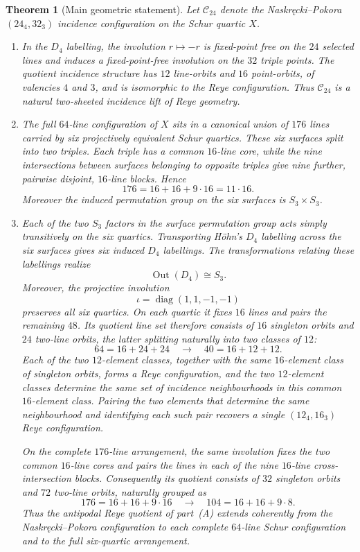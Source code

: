 \documentclass[10pt]{article}
\newtheorem{theorem}{Theorem}
\begin{document}
\begin{theorem}[Main geometric statement]\label{thm:main}
Let $\mathcal C_{24}$ denote the Naskr\k{e}cki--Pokora $(24_4,32_3)$ incidence configuration on the Schur quartic $X$.
\begin{enumerate}
\item[(A)] In the $D_4$ labelling, the involution $r\mapsto-r$ is fixed-point free on the $24$ selected lines and induces a fixed-point-free involution on the $32$ triple points.  The quotient incidence structure has $12$ line-orbits and $16$ point-orbits, of valencies $4$ and $3$, and is isomorphic to the Reye configuration.  Thus $\mathcal C_{24}$ is a natural two-sheeted incidence lift of Reye geometry.
\item[(B)] The full $64$-line configuration of $X$ sits in a canonical union of $176$ lines carried by six projectively equivalent Schur quartics.  These six surfaces split into two triples.  Each triple has a common $16$-line core, while the nine intersections between surfaces belonging to opposite triples give nine further, pairwise disjoint, $16$-line blocks.  Hence
\[
176=16+16+9\cdot16=11\cdot16.
\]
Moreover the induced permutation group on the six surfaces is $S_3\times S_3$.
\item[(C)] Each of the two $S_3$ factors in the surface permutation group
acts simply transitively on the six quartics.  Transporting H\"ohn's
$D_4$ labelling across the six surfaces gives six induced $D_4$ labellings.
The transformations relating these labellings realize
\[
\operatorname{Out}(D_4)\cong S_3.
\]
Moreover, the projective involution
\[
\iota=\operatorname{diag}(1,1,-1,-1)
\]
preserves all six quartics.  On each quartic it fixes $16$ lines and pairs
the remaining $48$.  Its quotient line set therefore consists of $16$
singleton orbits and $24$ two-line orbits, the latter splitting naturally
into two classes of $12$:
\[
64=16+24+24
\quad\longrightarrow\quad
40=16+12+12.
\]
Each of the two $12$-element classes, together with the same
$16$-element class of singleton orbits, forms a Reye configuration, and
the two $12$-element classes determine the same set of incidence
neighbourhoods in this common $16$-element class.  Pairing the two elements
that determine the same neighbourhood and identifying each such pair
recovers a single $(12_4,16_3)$ Reye configuration.

On the complete $176$-line arrangement, the same involution fixes the two
common $16$-line cores and pairs the lines in each of the nine
$16$-line cross-intersection blocks.  Consequently its quotient consists
of $32$ singleton orbits and $72$ two-line orbits, naturally grouped as
\[
176=16+16+9\cdot16
\quad\longrightarrow\quad
104=16+16+9\cdot8.
\]
Thus the antipodal Reye quotient of part~\textup{(A)} extends coherently
from the Naskr\k{e}cki--Pokora configuration to each complete
$64$-line Schur configuration and to the full six-quartic arrangement.
\end{enumerate}
\end{theorem}
\end{document}
